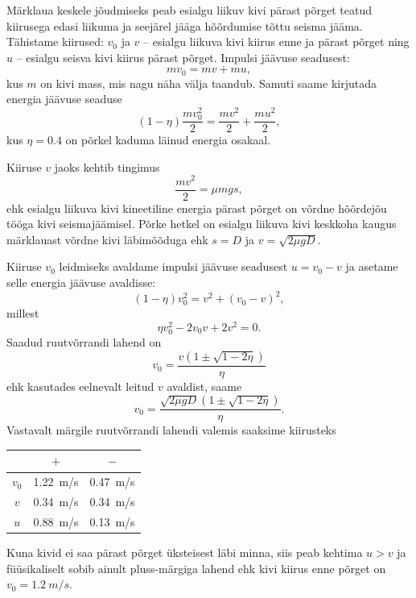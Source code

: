 Märklaua keskele jõudmiseks peab esialgu liikuv kivi pärast põrget teatud kiirusega edasi liikuma ja seejärel jääga hõõrdumise tõttu seisma jääma. Tähistame kiirused: $v_0$ ja $v$ -- esialgu liikuva kivi kiirus enne ja pärast põrget ning $u$ -- esialgu seisva kivi kiirus pärast põrget. Impulsi jäävuse seadusest:
\begin{equation}
mv_0 = mv + mu,
\end{equation}
kus $m$ on kivi mass, mis nagu näha välja taandub. Samuti saame kirjutada energia jäävuse seaduse
\begin{equation}
\left(1-\eta\right)\frac{mv_0^2}{2} = \frac{mv^2}{2} + \frac{mu^2}{2},
\end{equation}
kus $\eta = \num{0.4}$ on põrkel kaduma läinud energia osakaal.

Kiiruse $v$ jaoks kehtib tingimus
\begin{equation}
\frac{mv^2}{2} = \mu mgs,
\end{equation}
ehk esialgu liikuva kivi kineetiline energia pärast põrget on võrdne hõõrdejõu tööga kivi seismajäämisel. Põrke hetkel on esialgu liikuva kivi keskkoha kaugus märklauast võrdne kivi läbimõõduga ehk $s = D$ ja $v = \sqrt{2\mu gD}$.

Kiiruse $v_0$ leidmiseks avaldame impulsi jäävuse seadusest $u = v_0 - v$ ja asetame selle energia jäävuse avaldisse:
\begin{equation}
\left( 1 - \eta \right)v_0^2 = v^2 + \left(v_0 - v\right)^2, 
\end{equation}
millest
\begin{equation}
\eta v_0^2 - 2v_0 v + 2v^2 = 0.
\end{equation}
Saadud ruutvõrrandi lahend on
\begin{equation}
v_0 =  \frac{v\left( 1 \pm \sqrt{1-2\eta} \right)}{\eta}
\end{equation}
ehk kasutades eelnevalt leitud $v$ avaldist, saame
\begin{equation}
v_0 =  \frac{\sqrt{2\mu gD}\left( 1 \pm \sqrt{1-2\eta} \right)}{\eta}.
\end{equation}
Vastavalt märgile ruutvõrrandi lahendi valemis saaksime kiirusteks

\begin{center}
\begin{tabular}{|c|c|c|}
\hline 
 & $+$ & $-$ \\ 
\hline 
$v_0$ & \SI{1.22}{m/s} & \SI{0.47}{m/s} \\ 
\hline 
$v$ & \SI{0.34}{m/s} & \SI{0.34}{m/s} \\ 
\hline 
$u$ & \SI{0.88}{m/s} & \SI{0.13}{m/s} \\ 
\hline 
\end{tabular}
\end{center}

Kuna kivid ei saa pärast põrget üksteisest läbi minna, siis peab kehtima $u > v$ ja füüsikaliselt sobib ainult pluss-märgiga lahend ehk kivi kiirus enne põrget on $v_0 = \SI{1.2}{m/s}$.
\probend